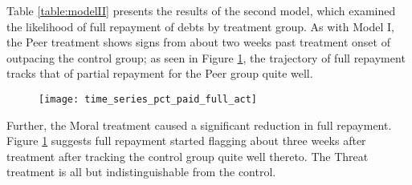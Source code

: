 \documentclass[12pt,titlepage]{article}
\begin{document}
Table \ref{table:modelII} presents the results of the second model,
which examined the likelihood of full repayment of debts by treatment
group. As with Model I, the Peer treatment shows signs from about two
weeks past treatment onset of outpacing the control group; as seen in
Figure \ref{paid_full_act}, the trajectory of full repayment tracks
that of partial repayment for the Peer group quite well.

\begin{figure}[htbp]
\begin{center}
\caption{} \label{paid_full_act}
\texttt{[image: time\_series\_pct\_paid\_full\_act]}
\par\end{center}
\end{figure}

Further, the Moral treatment caused a significant reduction in full
repayment. Figure \ref{paid_full_act} suggests full repayment started
flagging about three weeks after treatment after tracking the control
group quite well thereto. The Threat treatment is all but
indistinguishable from the control.
\end{document}
